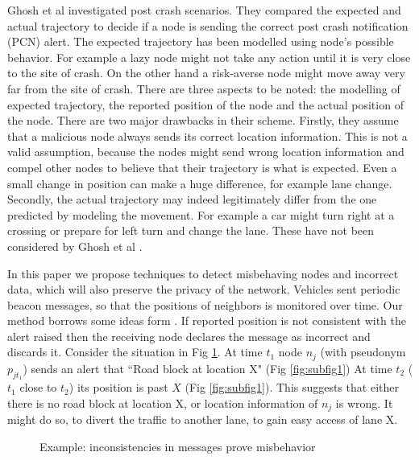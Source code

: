 \documentclass[conference]{IEEEtran}[10pt]
\begin{document}
Ghosh et al \cite{GVGKM10} investigated post crash scenarios. 
They compared the expected and actual trajectory to decide if a node is sending the correct post crash notification (PCN) alert. 
The expected trajectory has been modelled using node's possible behavior. 
For example a lazy node might not take any action until it is very close to the site of crash.
On the other hand a risk-averse node might move away very far from the site of crash.  
There are three aspects to be noted: the modelling of expected trajectory, the reported position of the node and the actual position of the node. 
There are two major drawbacks in their scheme.  
Firstly, they assume that a malicious node always sends its correct location information. 
This is not a valid assumption, because the nodes might send wrong location information and compel other nodes to believe
that their trajectory is what is expected. 
Even a small change in position can make a huge difference, for example lane change. 
Secondly, the actual trajectory may indeed legitimately differ from the one predicted by modeling the movement. For example a car might turn right at a crossing or prepare for left turn
and change the lane. These have not been considered by Ghosh et al \cite{GVGKM10}. 

In this paper we propose techniques to detect misbehaving nodes and incorrect data, which will also preserve the privacy of the network. Vehicles sent periodic beacon messages, so that the positions of neighbors is monitored over time. Our method borrows some ideas form \cite{GVGKM10}.
If reported position is not consistent with the alert raised then the receiving node declares the message as incorrect and discards it. 
Consider the situation in Fig \ref{fig:congestion}. 
At time $t_1$ node $n_j$ (with pseudonym $p_{jt_1}$) sends an alert that ``Road block at location X" (Fig \ref{fig:subfig1}) 
At time $t_2$ ($t_1$ close to $t_2$)  its position is past $X$ (Fig \ref{fig:subfig1}).  
This suggests that either there is no road block  at location  X, or location information of $n_j$ is wrong. 
It might do so, to divert the traffic to another lane, to gain easy access of lane X. 
\begin{figure}[htb]
        \centering
        \label{fig:congestion}
        \caption{Example: inconsistencies in messages prove misbehavior} 

    \end{figure}
\end{document}
